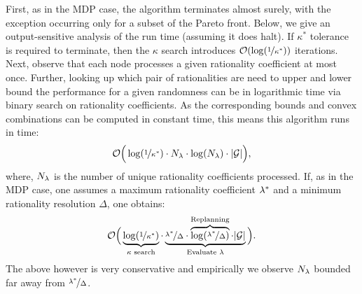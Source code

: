  First, as in the MDP case, the
algorithm terminates almost surely, with the exception occurring only
for a subset of the Pareto front.  Below, we give an output-sensitive
analysis of the run time (assuming it does halt).  If $\kappa^*$
tolerance is required to terminate, then the $\kappa$ search
introduces $\mathcal{O}(\log(\nicefrac{1}{\kappa^*}))$
iterations. Next, observe that each node processes a given rationality
coefficient at most once. Further, looking up which pair of rationalities
are need to upper and lower bound the performance for a given randomness
can be in logarithmic time via binary search on rationality coefficients.
As the corresponding bounds and convex combinations can be computed in
constant time, this means this algorithm runs in time:
\begin{equation}
  \label{eq:sg-runtime}
  \mathcal{O}\Big(\log(\nicefrac{1}{\kappa^*})\cdot N_\rat\cdot \log(N_\rat)\cdot |\sg|\Big),
\end{equation}
where, $N_\lambda$ is the number of unique rationality coefficients
processed.  If, as in the MDP case, one assumes a maximum rationality
coefficient $\lambda^*$ and a minimum rationality resolution $\Delta$,
one obtains:
\begin{equation}
  \mathcal{O}\Big(\underbrace{\log(\nicefrac{1}{\kappa^*})}_{\kappa \text{ search}}\cdot \underbrace{\nicefrac{\lambda^*}{\Delta}\cdot \overbrace{\log(\nicefrac{\lambda^*}{\Delta})}^{\text{Replanning}}\cdot |\mathcal{G}|}_{\text{Evaluate } \lambda}\Big).
\end{equation}
The above however is very conservative and empirically we observe
$N_\lambda$ bounded far away from $\nicefrac{\lambda^*}{\Delta}$.



